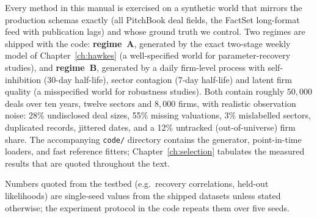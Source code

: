 Every method in this manual is exercised on a synthetic world that mirrors the production
schemas exactly (all PitchBook deal fields, the FactSet long-format feed with publication
lags) and whose ground truth we control. Two regimes are shipped with the code:
\textbf{regime~A}, generated by the exact two-stage weekly model of
Chapter~\ref{ch:hawkes} (a well-specified world for parameter-recovery studies), and
\textbf{regime~B}, generated by a daily firm-level process with self-inhibition (30-day
half-life), sector contagion (7-day half-life) and latent firm quality (a misspecified
world for robustness studies). Both contain roughly $50{,}000$ deals over ten years,
twelve sectors and $8{,}000$ firms, with realistic observation noise: 28\% undisclosed
deal sizes, 55\% missing valuations, 3\% mislabelled sectors, duplicated records, jittered
dates, and a 12\% untracked (out-of-universe) firm share. The accompanying
\texttt{code/} directory contains the generator, point-in-time loaders, and fast reference
fitters; Chapter~\ref{ch:selection} tabulates the measured results that are quoted
throughout the text.

\begin{remark}
Numbers quoted from the testbed (e.g.\ recovery correlations, held-out likelihoods) are
single-seed values from the shipped datasets unless stated otherwise; the experiment
protocol in the code repeats them over five seeds.
\end{remark}
